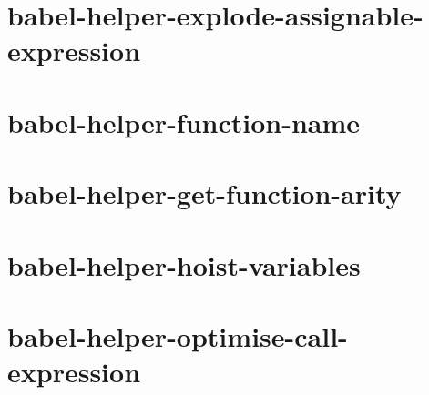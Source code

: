 \documentclass[twoside]{book}
\newcommand{\+}{\discretionary{\mbox{\scriptsize$\hookleftarrow$}}{}{}}
\begin{document}
\chapter{babel-\/helper-\/explode-\/assignable-\/expression}
\label{md__c_1_workspace_demo_src_main_script_node_modules_babel-helper-explode-assignable-expression__r_e_a_d_m_e}

\chapter{babel-\/helper-\/function-\/name}
\label{md__c_1_workspace_demo_src_main_script_node_modules_babel-helper-function-name__r_e_a_d_m_e}

\chapter{babel-\/helper-\/get-\/function-\/arity}
\label{md__c_1_workspace_demo_src_main_script_node_modules_babel-helper-get-function-arity__r_e_a_d_m_e}

\chapter{babel-\/helper-\/hoist-\/variables}
\label{md__c_1_workspace_demo_src_main_script_node_modules_babel-helper-hoist-variables__r_e_a_d_m_e}

\chapter{babel-\/helper-\/optimise-\/call-\/expression}
\label{md__c_1_workspace_demo_src_main_script_node_modules_babel-helper-optimise-call-expression__r_e_a_d_m_e}

\end{document}
